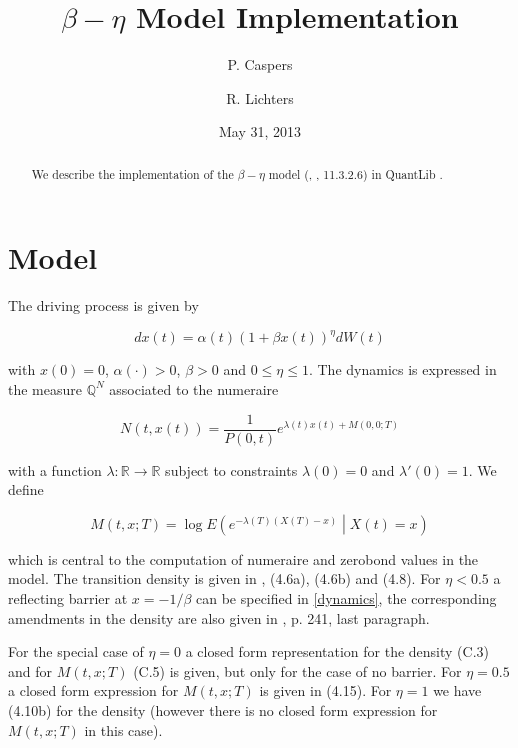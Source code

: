 \documentclass{amsart}
\theoremstyle{plain}
\numberwithin{equation}{section}
\begin{document}
\title[$\beta-\eta$ Model Implementation]{$\beta-\eta$ Model Implementation}
\author{P. Caspers}
\author{R. Lichters}
\date{May 31, 2013}
\begin{abstract}
We describe the implementation of the $\beta-\eta$ model (\cite{betaeta}, \cite{piterbarg}, 11.3.2.6) in QuantLib \cite{ql}.
\end{abstract}

\maketitle

\section{Model}

The driving process is given by

\begin{equation}\label{dynamics}
dx(t) = \alpha(t) ( 1 + \beta x(t) )^\eta dW(t) 
\end{equation}

with $x(0)=0$, $\alpha(\cdot) > 0$, $\beta > 0$ and $0 \leq \eta \leq 1$. The dynamics is expressed in the measure $\mathbb{Q}^N$ associated to the numeraire

\begin{equation}
N(t,x(t)) = \frac{1}{P(0,t)}e^{\lambda(t)x(t)+M(0,0;T)}
\end{equation}

with a function $\lambda: \mathbb{R}\rightarrow\mathbb{R}$ subject to constraints $\lambda(0)=0$ and $\lambda'(0)=1$. We define

\begin{equation}\label{formula_M}
M(t,x;T) = \log E \left( e^{-\lambda(T)(X(T)-x)} \middle | X(t)=x \right)
\end{equation}

which is central to the computation of numeraire and zerobond values in the model. The transition density is given in \cite{betaeta}, (4.6a), (4.6b) and (4.8). For $\eta < 0.5$ a reflecting barrier at $x=-1/\beta$ can be specified in \ref{dynamics}, the corresponding amendments in the density are also given in \cite{betaeta}, p. 241, last paragraph.

For the special case of $\eta=0$ a closed form representation for the density (C.3) and for $M(t,x;T)$ (C.5) is given, but only for the case of no barrier. For $\eta=0.5$ a closed form expression for $M(t,x;T)$ is given in (4.15). For $\eta=1$ we have (4.10b) for the density (however there is no closed form expression for $M(t,x;T)$ in this case).
\end{document}
